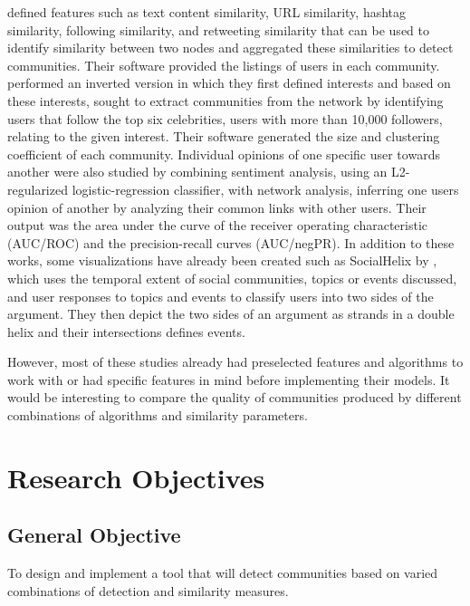  defined features such as text content similarity, URL similarity, hashtag similarity, following similarity, and retweeting similarity that can be used to identify similarity between two nodes and aggregated these similarities to detect communities. Their software provided the listings of users in each community.  performed an inverted version in which they first defined interests and based on these interests, sought to extract communities from the network by identifying users that follow the top six celebrities, users with more than 10,000 followers, relating to the given interest. Their software generated the size and clustering coefficient of each community. Individual opinions of one specific user towards another were also studied by  combining sentiment analysis, using an L2-regularized logistic-regression classifier, with network analysis, inferring one user\vtick s opinion of another by analyzing their common links with other users. Their output was the area under the curve of the receiver operating characteristic (AUC/ROC) and the precision-recall curves (AUC/negPR). In addition to these works, some visualizations have already been created such as SocialHelix by , which uses the temporal extent of social communities, topics or events discussed, and user responses to topics and events to classify users into two sides of the argument. They then depict the two sides of an argument as strands in a double helix and their intersections defines events.


However, most of these studies already had preselected features and algorithms to work with or had specific features in mind before implementing their models. It would be interesting to compare the quality of communities produced by different combinations of algorithms and similarity parameters.


\section{Research Objectives}
\label{sec:researchobjectives}


\subsection{General Objective}
\label{sec:generalobjective}


To design and implement a tool that will detect communities based on varied combinations of detection and similarity measures.


